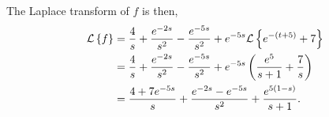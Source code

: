 \documentclass[../hw7]{subfiles}
\begin{document}
\begin{enumerate}[label= (\alph*)]
    The Laplace transform of $f$ is then, 
    \begin{align*}
        \mathcal{L}\left\{f\right\}&=\frac{4}{s}+\frac{e^{-2s}}{s^2}-\frac{e^{-5s}}{s^2}+e^{-5s}\mathcal{L}\left\{e^{-(t+5)}+7\right\}\\
        &=\frac{4}{s}+\frac{e^{-2s}}{s^2}-\frac{e^{-5s}}{s^2}+e^{-5s}\left( \frac{e^5}{s+1}+\frac{7}{s} \right) \\
        &=\frac{4+7e^{-5s}}{s}+\frac{e^{-2s}-e^{-5s}}{s^2}+\frac{e^{5(1-s)}}{s+1}. \\
    \end{align*}

\end{enumerate}
\end{document}
